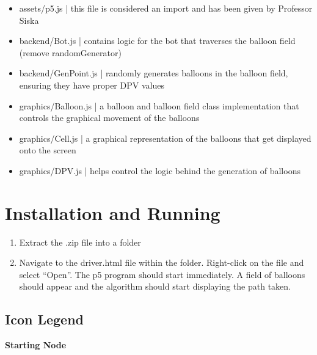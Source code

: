\documentclass{article}
\begin{document}
\begin{itemize}
\item assets/p5.js | this file is considered an import and has been given by Professor Siska
\item backend/Bot.js | contains logic for the bot that traverses the balloon field (remove randomGenerator)
\item backend/GenPoint.js | randomly generates balloons in the balloon field, ensuring they have proper DPV values
\item graphics/Balloon.js | a balloon and balloon field class implementation that controls the graphical movement of the balloons
\item graphics/Cell.js | a graphical representation of the balloons that get displayed onto the screen
\item graphics/DPV.js | helps control the logic behind the generation of balloons
\end{itemize}

\newpage

\section{Installation and Running}

\begin{enumerate}
\item Extract the .zip file into a folder
\item Navigate to the driver.html file within the folder. Right-click on the file and select “Open”. The p5 program should start immediately. A field of balloons should appear and the algorithm should start displaying the path taken.
\end{enumerate}

\subsection{Icon Legend}

\begin{center}
\large \textbf{Starting Node}


\end{center}
\end{document}
